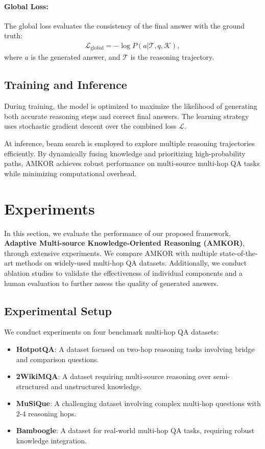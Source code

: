 \paragraph{Global Loss:}
The global loss evaluates the consistency of the final answer with the ground truth:
\begin{align}
\mathcal{L}_{\text{global}} = -\log P(a | \mathcal{T}, q, \mathcal{K}),
\end{align}
where \( a \) is the generated answer, and \( \mathcal{T} \) is the reasoning trajectory.

\subsection{Training and Inference}

During training, the model is optimized to maximize the likelihood of generating both accurate reasoning steps and correct final answers. The learning strategy uses stochastic gradient descent over the combined loss \( \mathcal{L} \). 

At inference, beam search is employed to explore multiple reasoning trajectories efficiently. By dynamically fusing knowledge and prioritizing high-probability paths, AMKOR achieves robust performance on multi-source multi-hop QA tasks while minimizing computational overhead.



\section{Experiments}

In this section, we evaluate the performance of our proposed framework, \textbf{Adaptive Multi-source Knowledge-Oriented Reasoning (AMKOR)}, through extensive experiments. We compare AMKOR with multiple state-of-the-art methods on widely-used multi-hop QA datasets. Additionally, we conduct ablation studies to validate the effectiveness of individual components and a human evaluation to further assess the quality of generated answers.

\subsection{Experimental Setup}

We conduct experiments on four benchmark multi-hop QA datasets:
\begin{itemize}
    \item \textbf{HotpotQA}: A dataset focused on two-hop reasoning tasks involving bridge and comparison questions.
    \item \textbf{2WikiMQA}: A dataset requiring multi-source reasoning over semi-structured and unstructured knowledge.
    \item \textbf{MuSiQue}: A challenging dataset involving complex multi-hop questions with 2-4 reasoning hops.
    \item \textbf{Bamboogle}: A dataset for real-world multi-hop QA tasks, requiring robust knowledge integration.
\end{itemize}

